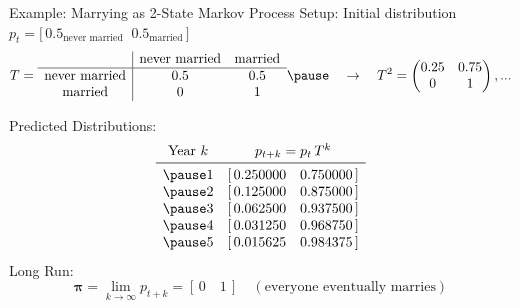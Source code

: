 \documentclass[11pt,table]{beamer}
\begin{document}
\begin{frame}{Example: Marrying as 2-State Markov Process}
\small
Setup: Initial distribution $
p_t = \bigl[\,0.5_{\text{never married}}\;\;0.5_{\text{married}}\,\bigr]
$
\pause
\[
T =
\begin{array}{c|cc}
 & \text{never married} & \text{married} \\ \hline
\text{never married} & 0.5 & 0.5 \\
\text{married}       & 0   & 1
\end{array}\pause
\quad\rightarrow\quad
T^2 =
\begin{pmatrix}
0.25 & 0.75 \\
0    & 1
\end{pmatrix},...
\]

\pause

Predicted Distributions:
\[
\begin{array}{cc}
\text{Year }k & p_{t+k} = p_{t}\,T^k 
\\\midrule\pause
1 & [\,0.250000\quad 0.750000\,] \\\pause
2 & [\,0.125000\quad 0.875000\,] \\\pause
3 & [\,0.062500\quad 0.937500\,] \\\pause
4 & [\,0.031250\quad 0.968750\,] \\\pause
5 & [\,0.015625\quad 0.984375\,]
\end{array}
\]
\pause
Long Run:
\[
\boldsymbol{\pi} = \lim_{k \to \infty} p_{t+k}
= [\,0\quad 1\,]
\quad(\text{everyone eventually marries})
\]
\end{frame}
\end{document}
